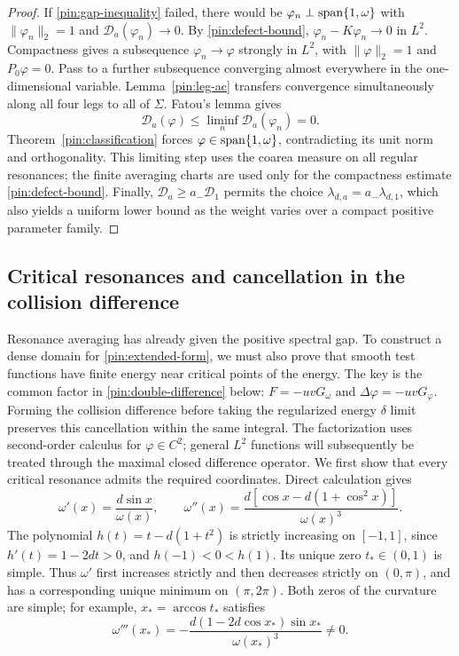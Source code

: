 \begin{proof}
If \eqref{pin:gap-inequality} failed, there would be
$\varphi_n\perp\operatorname{span}\{1,\omega\}$ with $\|\varphi_n\|_2=1$ and
$\mathcal D_a(\varphi_n)\to0$. By \eqref{pin:defect-bound},
$\varphi_n-K\varphi_n\to0$ in $L^2$. Compactness gives a subsequence
$\varphi_n\to\varphi$ strongly in $L^2$, with $\|\varphi\|_2=1$ and
$P_0\varphi=0$. Pass to a further subsequence converging almost
everywhere in the one-dimensional variable. Lemma~\ref{pin:leg-ac}
transfers convergence simultaneously along all four legs to all of
$\Sigma$. Fatou's lemma gives
\[
                    \mathcal D_a(\varphi)
                    \le\liminf_n\mathcal D_a(\varphi_n)=0.
\]
Theorem~\ref{pin:classification} forces
$\varphi\in\operatorname{span}\{1,\omega\}$, contradicting its unit norm and
orthogonality. This limiting step uses the coarea measure on all regular
resonances; the finite averaging charts are used only for the compactness
estimate \eqref{pin:defect-bound}.
Finally, $\mathcal D_a\ge a_-\mathcal D_1$ permits the choice
$\lambda_{d,a}=a_-\lambda_{d,1}$, which also yields a uniform lower
bound as the weight varies over a compact positive parameter family.
\end{proof}

\subsection{Critical resonances and cancellation in the collision difference}
\label{pin:critical}

Resonance averaging has already given the positive spectral gap. To
construct a dense domain for \eqref{pin:extended-form}, we must also
prove that smooth test functions have finite energy near critical
points of the energy. The key is the common factor in
\eqref{pin:double-difference} below:
$F=-uvG_\omega$ and $\Delta\varphi=-uvG_\varphi$.
Forming the collision difference before taking the regularized energy
$\delta$ limit preserves this cancellation within the same integral.
The factorization uses second-order calculus for $\varphi\in C^2$;
general $L^2$ functions will subsequently be treated through the
maximal closed difference operator. We first show that every critical
resonance admits the required coordinates. Direct calculation gives
\begin{equation}
 \omega'(x)=\frac{d\sin x}{\omega(x)},\qquad
 \omega''(x)=\frac{d[\cos x-d(1+\cos^2x)]}{\omega(x)^3}.
 \label{pin:curvature}
\end{equation}
The polynomial $h(t)=t-d(1+t^2)$ is strictly increasing on $[-1,1]$,
since $h'(t)=1-2dt>0$, and $h(-1)<0<h(1)$. Its unique zero
$t_*\in(0,1)$ is simple. Thus $\omega'$ first increases strictly
and then decreases strictly on $(0,\pi)$, and has a corresponding
unique minimum on $(\pi,2\pi)$. Both zeros of the curvature are simple;
for example, $x_* =\arccos t_*$ satisfies
\begin{equation}
             \omega'''(x_*)=
             -\frac{d(1-2d\cos x_*)\sin x_*}{\omega(x_*)^3}\ne0.
 \label{pin:simple-inflection}
\end{equation}

